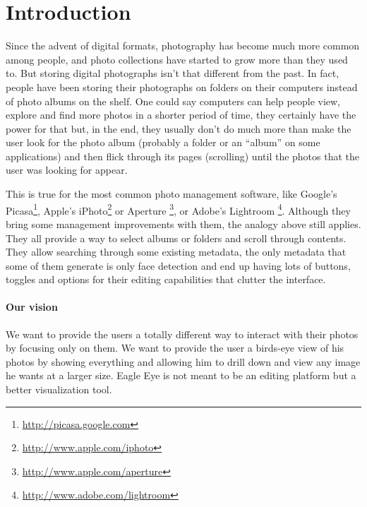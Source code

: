 \chapter{Introduction} %
\label{chapter:introduction}



Since the advent of digital formats, photography has become much more common among people, and photo collections have started to grow more than they used to. But storing digital photographs isn't that different from the past. In fact, people have been storing their photographs on folders on their computers instead of photo albums on the shelf. One could say computers can help people view, explore and find more photos in a shorter period of time, they certainly have the power for that but, in the end, they usually don't do much more than make the user look for the photo album (probably a folder or an ``album'' on some applications) and then flick through its pages (scrolling) until the photos that the user was looking for appear.

This is true for the most common photo management software, like Google's Picasa\footnote{\url{http://picasa.google.com}}, Apple's iPhoto\footnote{\url{http://www.apple.com/iphoto}} or Aperture \footnote{\url{http://www.apple.com/aperture}}, or Adobe's Lightroom \footnote{\url{http://www.adobe.com/lightroom}}. Although they bring some management improvements with them, the analogy above still applies. They all provide a way to select albums or folders and scroll through contents. They allow searching through some existing metadata, the only metadata that some of them generate is only face detection and end up having lots of buttons, toggles and options for their editing capabilities that clutter the interface.




\subsubsection{Our vision} %
\label{ssub:our_vision}


We want to provide the users a totally different way to interact with their photos by focusing only on them. We want to provide the user a birds-eye view of his photos by showing everything and allowing him to drill down and view any image he wants at a larger size. Eagle Eye is not meant to be an editing platform but a better visualization tool.

